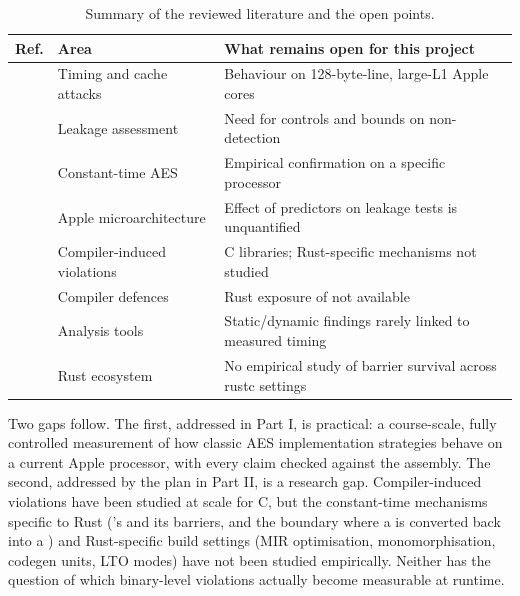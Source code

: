 \begin{table}[htbp]
\centering
\small
\renewcommand{\arraystretch}{1.18}
\begin{tabular}{@{}P{0.15\textwidth}P{0.26\textwidth}P{0.51\textwidth}@{}}
\toprule
Ref. & Area & What remains open for this project \\
\midrule
\cite{kocher96,bernstein05,osvik06} & Timing and cache attacks & Behaviour on 128-byte-line, large-L1 Apple cores \\
\cite{tvla,dudect,welch47} & Leakage assessment & Need for controls and bounds on non-detection \\
\cite{kasper09,hamburg09} & Constant-time AES & Empirical confirmation on a specific processor \\
\cite{gofetch,slap,flop} & Apple microarchitecture & Effect of predictors on leakage tests is unquantified \\
\cite{breakingbad,funwithflags,docc} & Compiler-induced violations & C libraries; Rust-specific mechanisms not studied \\
\cite{robocop,tobctselect} & Compiler defences & Rust exposure of  not available \\
\cite{ctgrind,microwalk,pitchfork,autobenchct} & Analysis tools & Static/dynamic findings rarely linked to measured timing \\
\cite{subtle,blackbox,rustsec2025_0144} & Rust ecosystem & No empirical study of barrier survival across rustc settings \\
\bottomrule
\end{tabular}
\caption{Summary of the reviewed literature and the open points.}
\label{tab:lit}
\end{table}

Two gaps follow. The first, addressed in Part I, is practical: a course-scale, fully controlled measurement of how classic AES implementation strategies behave on a current Apple processor, with every claim checked against the assembly. The second, addressed by the plan in Part II, is a research gap. Compiler-induced violations have been studied at scale for C, but the constant-time mechanisms specific to Rust ('s  and its barriers, and the boundary where a  is converted back into a ) and Rust-specific build settings (MIR optimisation, monomorphisation, codegen units, LTO modes) have not been studied empirically. Neither has the question of which binary-level violations actually become measurable at runtime.
